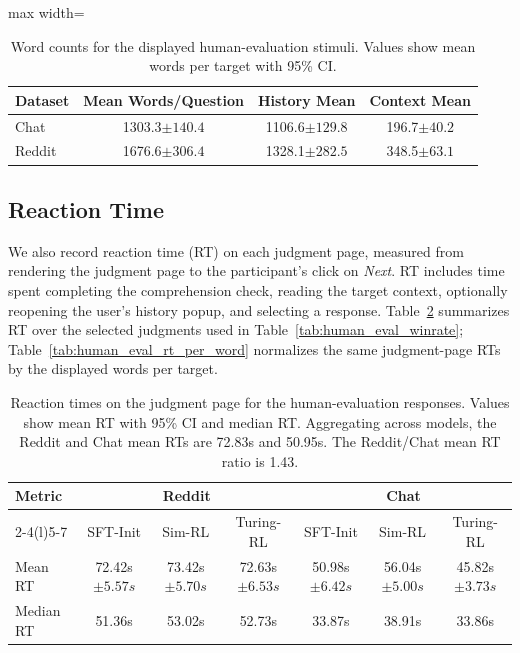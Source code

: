 \documentclass[11pt]{article}
\newcommand{\subtle}[1]{{\tiny\color[gray]{0.4}#1}}
\begin{document}
\begin{table}[t]
\centering
\small
\setlength{\tabcolsep}{4pt}
\begin{adjustbox}{max width=\linewidth}
\begin{tabular}{@{}lccc@{}}
\toprule
Dataset & Mean Words/Question & History Mean & Context Mean \\
\midrule
Chat & 1303.3\subtle{$\pm 140.4$} & 1106.6\subtle{$\pm 129.8$} & 196.7\subtle{$\pm 40.2$} \\
Reddit & 1676.6\subtle{$\pm 306.4$} & 1328.1\subtle{$\pm 282.5$} & 348.5\subtle{$\pm 63.1$} \\
\bottomrule
\end{tabular}
\end{adjustbox}
\caption{Word counts for the displayed human-evaluation stimuli. Values show mean words per target with 95\% CI.}
\label{tab:human_eval_word_counts}
\end{table}

\subsection{Reaction Time}
We also record reaction time (RT) on each judgment page, measured from rendering the judgment page to the participant's click on \textit{Next}. RT includes time spent completing the comprehension check, reading the target context, optionally reopening the user's history popup, and selecting a response. Table~\ref{tab:human_eval_rt} summarizes RT over the selected judgments used in Table~\ref{tab:human_eval_winrate}; Table~\ref{tab:human_eval_rt_per_word} normalizes the same judgment-page RTs by the displayed words per target.

\begin{table}[t]
\centering
\small
\setlength{\tabcolsep}{3.5pt}
\begin{tabular*}{\textwidth}{@{\extracolsep{\fill}}lcccccc@{}}
\toprule
\multirow{2}{*}{Metric} & \multicolumn{3}{c}{Reddit} & \multicolumn{3}{c}{Chat} \\
\cmidrule(lr){2-4}\cmidrule(l){5-7}
 & SFT-Init & Sim-RL & Turing-RL & SFT-Init & Sim-RL & Turing-RL \\
\midrule
Mean RT & 72.42s\subtle{$\pm 5.57s$} & 73.42s\subtle{$\pm 5.70s$} & 72.63s\subtle{$\pm 6.53s$} & 50.98s\subtle{$\pm 6.42s$} & 56.04s\subtle{$\pm 5.00s$} & 45.82s\subtle{$\pm 3.73s$} \\
Median RT & 51.36s & 53.02s & 52.73s & 33.87s & 38.91s & 33.86s \\
\bottomrule
\end{tabular*}
\caption{Reaction times on the judgment page for the human-evaluation responses. Values show mean RT with 95\% CI and median RT. Aggregating across models, the Reddit and Chat mean RTs are 72.83s and 50.95s. The Reddit/Chat mean RT ratio is 1.43.}
\label{tab:human_eval_rt}
\end{table}
\end{document}
